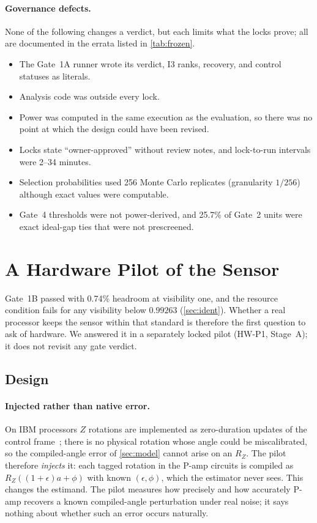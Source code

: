 \documentclass[10pt,twocolumn]{article}
\theoremstyle{definition}
\theoremstyle{remark}
\newcommand{\eps}{\epsilon}
\newcommand{\RZ}{R_Z}
\begin{document}
\paragraph{Governance defects.} None of the following changes a verdict, but each limits what the locks prove; all are documented in the errata listed in \cref{tab:frozen}.
\begin{itemize}
\item The Gate~1A runner wrote its verdict, I3 ranks, recovery, and control statuses as literals.
\item Analysis code was outside every lock.
\item Power was computed in the same execution as the evaluation, so there was no point at which the design could have been revised.
\item Locks state ``owner-approved'' without review notes, and lock-to-run intervals were 2--34 minutes.
\item Selection probabilities used 256 Monte Carlo replicates (granularity $1/256$) although exact values were computable.
\item Gate~4 thresholds were not power-derived, and 25.7\% of Gate~2 units were exact ideal-gap ties that were not prescreened.
\end{itemize}

\section{A Hardware Pilot of the Sensor}\label{sec:hardware}

Gate~1B passed with 0.74\% headroom at visibility one, and the resource condition fails for any visibility below $0.99263$ (\cref{sec:ident}). Whether a real processor keeps the sensor within that standard is therefore the first question to ask of hardware. We answered it in a separately locked pilot (HW-P1, Stage~A); it does not revisit any gate verdict.

\subsection{Design}
\paragraph{Injected rather than native error.} On IBM processors $Z$ rotations are implemented as zero-duration updates of the control frame~\cite{mckay2017vz}; there is no physical rotation whose angle could be miscalibrated, so the compiled-angle error of \cref{sec:model} cannot arise on an $\RZ$. The pilot therefore \emph{injects} it: each tagged rotation in the P-amp circuits is compiled as $\RZ((1+\eps)a+\phi)$ with known $(\eps,\phi)$, which the estimator never sees. This changes the estimand. The pilot measures how precisely and how accurately P-amp recovers a known compiled-angle perturbation under real noise; it says nothing about whether such an error occurs naturally.
\end{document}
